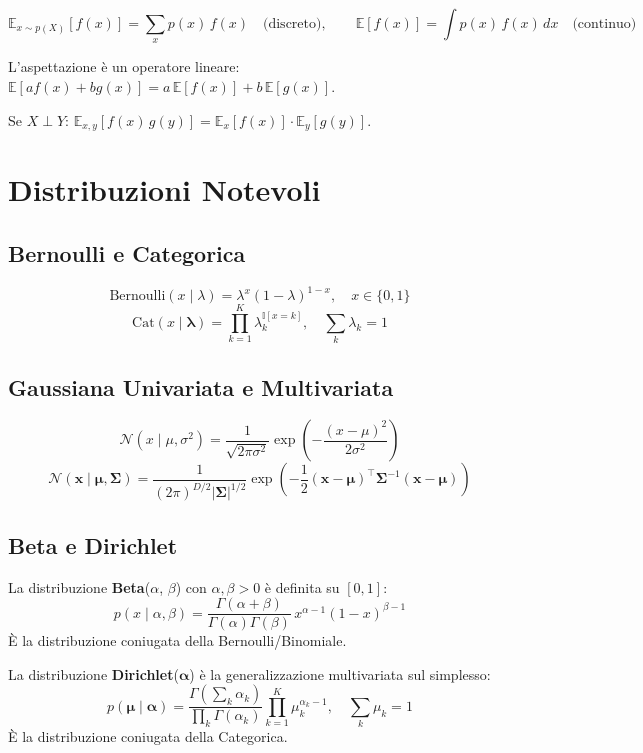 \[
\mathbb{E}_{x \sim p(X)}[f(x)] = \sum_x p(x)\,f(x) \quad \text{(discreto)}, \qquad \mathbb{E}[f(x)] = \int p(x)\,f(x)\,dx \quad \text{(continuo)}
\]

L'aspettazione è un operatore lineare: $\mathbb{E}[af(x) + bg(x)] = a\,\mathbb{E}[f(x)] + b\,\mathbb{E}[g(x)]$.

Se $X \perp Y$: $\mathbb{E}_{x,y}[f(x)\,g(y)] = \mathbb{E}_x[f(x)] \cdot \mathbb{E}_y[g(y)]$.

\section{Distribuzioni Notevoli}

\subsection{Bernoulli e Categorica}
\[
\text{Bernoulli}(x \mid \lambda) = \lambda^x (1-\lambda)^{1-x}, \quad x \in \{0,1\}
\]
\[
\text{Cat}(x \mid \boldsymbol{\lambda}) = \prod_{k=1}^K \lambda_k^{\mathbb{I}[x=k]}, \quad \sum_k \lambda_k = 1
\]

\subsection{Gaussiana Univariata e Multivariata}
\[
\mathcal{N}(x \mid \mu, \sigma^2) = \frac{1}{\sqrt{2\pi\sigma^2}} \exp\!\left(-\frac{(x-\mu)^2}{2\sigma^2}\right)
\]
\[
\mathcal{N}(\mathbf{x} \mid \boldsymbol{\mu}, \boldsymbol{\Sigma}) = \frac{1}{(2\pi)^{D/2}|\boldsymbol{\Sigma}|^{1/2}} \exp\!\left(-\frac{1}{2}(\mathbf{x}-\boldsymbol{\mu})^\top \boldsymbol{\Sigma}^{-1} (\mathbf{x}-\boldsymbol{\mu})\right)
\]

\subsection{Beta e Dirichlet}

La distribuzione \textbf{Beta}($\alpha$, $\beta$) con $\alpha, \beta > 0$ è definita su $[0,1]$:
\[
p(x \mid \alpha, \beta) = \frac{\Gamma(\alpha+\beta)}{\Gamma(\alpha)\Gamma(\beta)}\, x^{\alpha-1}(1-x)^{\beta-1}
\]
È la distribuzione coniugata della Bernoulli/Binomiale.

La distribuzione \textbf{Dirichlet}($\boldsymbol{\alpha}$) è la generalizzazione multivariata sul simplesso:
\[
p(\boldsymbol{\mu} \mid \boldsymbol{\alpha}) = \frac{\Gamma(\sum_k \alpha_k)}{\prod_k \Gamma(\alpha_k)} \prod_{k=1}^K \mu_k^{\alpha_k - 1}, \quad \sum_k \mu_k = 1
\]
È la distribuzione coniugata della Categorica.

